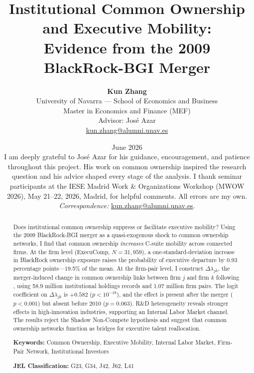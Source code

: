 \documentclass[11pt,a4paper]{article}
\begin{document}
\title{\textbf{Institutional Common Ownership and Executive Mobility:\\Evidence from the 2009 BlackRock-BGI Merger}}
\author{\textbf{Kun Zhang}\\[4pt]
University of Navarra --- School of Economics and Business\\
Master in Economics and Finance (MEF)\\[4pt]
Advisor: Jos\'{e} Azar\\[2pt]
\href{mailto:kun.zhang@alumni.unav.es}{kun.zhang@alumni.unav.es}}
\date{June 2026\\[6pt]
\footnotesize
I am deeply grateful to Jos\'{e} Azar for his guidance, encouragement, and patience throughout this project. His work on common ownership inspired the research question and his advice shaped every stage of the analysis. I thank seminar participants at the IESE Madrid Work \& Organizations Workshop (MWOW 2026), May 21--22, 2026, Madrid, for helpful comments. All errors are my own.\\
\textit{Correspondence:} \href{mailto:kun.zhang@alumni.unav.es}{kun.zhang@alumni.unav.es}.}

\maketitle

\begin{abstract}
\noindent
Does institutional common ownership suppress or facilitate executive mobility? Using the 2009 BlackRock-BGI merger as a quasi-exogenous shock to common ownership networks, I find that common ownership \textit{increases} C-suite mobility across connected firms. At the firm level (ExecuComp, $N=31{,}959$), a one-standard-deviation increase in BlackRock ownership exposure raises the probability of executive departure by 0.93 percentage points---19.5\% of the mean. At the firm-pair level, I construct $\Delta\lambda_{jk}$, the merger-induced change in common ownership links between firm $j$ and firm $k$ following \cite{azar2018}, using 58.9 million institutional holdings records and 1.07 million firm pairs. The logit coefficient on $\Delta\lambda_{jk}$ is $+0.582$ ($p<10^{-18}$), and the effect is present after the merger ($p<0.001$) but absent before 2010 ($p=0.063$). R\&D heterogeneity reveals stronger effects in high-innovation industries, supporting an Internal Labor Market channel. The results reject the Shadow Non-Compete hypothesis and suggest that common ownership networks function as bridges for executive talent reallocation.

\bigskip
\noindent\textbf{Keywords:} Common Ownership, Executive Mobility, Internal Labor Market, Firm-Pair Network, Institutional Investors

\noindent\textbf{JEL Classification:} G23, G34, J42, J62, L41
\end{abstract}
\end{document}
